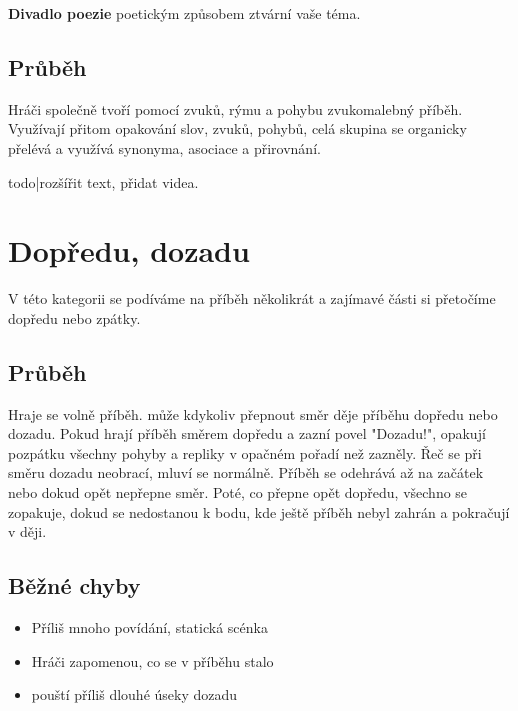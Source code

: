  
\textbf{Divadlo poezie}{} poetickým způsobem ztvární vaše téma. 
 
 
\subsection{Průběh} Hráči společně tvoří pomocí zvuků, rýmu a pohybu zvukomalebný příběh. 
Využívají přitom opakování slov, zvuků, pohybů, celá skupina se organicky přelévá a využívá synonyma, asociace a přirovnání. 
 
{{todo|rozšířit text, přidat videa.}} 
 
 
 
 
 
\needspace{5cm} \section{Dopředu, dozadu} \label{dopředu, dozadu}  
 
V této kategorii se podíváme na příběh několikrát a zajímavé části si přetočíme dopředu nebo zpátky. 
 
\subsection{ Průběh } Hraje se volně příběh.  může kdykoliv přepnout směr děje příběhu dopředu nebo dozadu. Pokud  hrají příběh směrem dopředu a zazní povel "Dozadu!", opakují pozpátku všechny pohyby a repliky v opačném pořadí než zazněly. Řeč se při směru dozadu neobrací, mluví se normálně. Příběh se odehrává až na začátek nebo dokud  opět nepřepne směr. Poté, co  přepne opět dopředu, všechno se zopakuje, dokud se  nedostanou k bodu, kde ještě příběh nebyl zahrán a pokračují v ději. 
 
\subsection{ Běžné chyby } \begin{itemize}
\item  Příliš mnoho povídání, statická scénka
\item  Hráči zapomenou, co se v příběhu stalo
\item  {} pouští příliš dlouhé úseky dozadu
\end{itemize}
 
 
 
 
 
